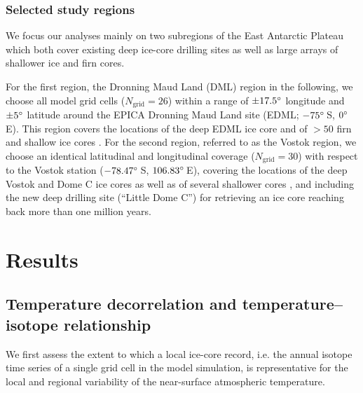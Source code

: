 \documentclass[cp, manuscript]{copernicus}
\begin{document}
\subsubsection{Selected study regions}\label{methods:regions}

We focus our analyses mainly on two subregions of the East Antarctic Plateau
which both cover existing deep ice-core drilling sites as well as large arrays
of shallower ice and firn cores.

For the first region, the Dronning Maud Land (DML) region in the following, we
choose all model grid cells ($N_{\mathrm{grid}}=26$) within a range of
$\pm17.5^{\circ}$ longitude and $\pm5^{\circ}$ latitude around the EPICA Dronning
Maud Land site (EDML; $-75^{\circ}$\,S, $0^{\circ}$\,E). This region covers the
locations of the deep EDML ice core \citep{EPICAcommunitymembers2006} and of
$>50$ firn and shallow ice cores \citep{Altnau2015}. For the second region,
referred to as the Vostok region, we choose an identical latitudinal and
longitudinal coverage ($N_{\mathrm{grid}}=30$) with respect to the Vostok
station ($-78.47^{\circ}$\,S, $106.83^{\circ}$\,E), covering the locations of the
deep Vostok and Dome C ice cores as well as of several shallower cores
\citep{Stenni2017}, and including the new deep drilling site (``Little Dome C'')
for retrieving an ice core reaching back more than one million years.

\section{Results}\label{results}

\subsection{Temperature decorrelation and temperature--isotope relationship}
\label{results:t2m-iso}

We first assess the extent to which a local ice-core record, i.e. the annual
isotope time series of a single grid cell in the model simulation, is
representative for the local and regional variability of the near-surface
atmospheric temperature.
\end{document}
